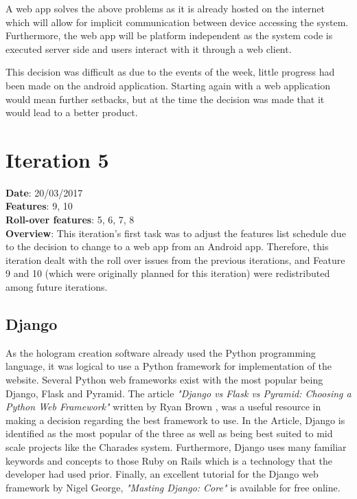 A web app solves the above problems as it is already hosted on the internet which will allow for implicit communication between device accessing the system. Furthermore, the web app will be platform independent as the system code is executed server side and users interact with it through a web client.

This decision was difficult as due to the events of the week, little progress had been made on the android application. Starting again with a web application would mean further setbacks, but at the time the decision was made that it would lead to a better product.

\newpage

\section{Iteration 5}
\textbf{Date}: 20/03/2017 \\
\textbf{Features}: 9, 10 \\
\textbf{Roll-over features}: 5, 6, 7, 8 \\
\textbf{Overview}: This iteration's first task was to adjust the features list schedule due to the decision to change to a web app from an Android app. Therefore, this iteration dealt with the roll over issues from the previous iterations, and Feature 9 and 10 (which were originally planned for this iteration) were redistributed among future iterations.

\subsection{Django}
As the hologram creation software already used the Python programming language, it was logical to use a Python framework for implementation of the website. Several Python web frameworks exist with the most popular being Django, Flask and Pyramid. The article \textit{"Django vs Flask vs Pyramid: Choosing a Python Web Framework"} written by Ryan Brown \cite{python_webframework_comparison}, was a useful resource in making a decision regarding the best framework to use. In the Article, Django is identified as the most popular of the three as well as being best suited to mid scale projects like the Charades system. Furthermore, Django uses many familiar keywords and concepts to those Ruby on Rails which is a technology that the developer had used prior. Finally, an excellent tutorial for the Django web framework by Nigel George, \textit{"Masting Django: Core"} \cite{django_book} is available for free online. 

